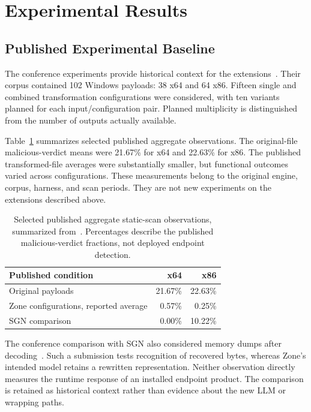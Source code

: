 \section{Experimental Results}\label{sec:results}
\subsection{Published Experimental Baseline}\label{sec:baseline}
The conference experiments provide historical context for the
extensions~\cite{zone_secrypt_2026}. Their corpus contained 102 Windows
payloads: 38 x64 and 64 x86. Fifteen single and combined transformation
configurations were considered, with ten variants planned for each
input/configuration pair. Planned multiplicity is distinguished from
the number of outputs actually available.

Table~\ref{tab:historical} summarizes selected published aggregate
observations. The original-file malicious-verdict means were 21.67\%
for x64 and 22.63\% for x86. The published transformed-file averages were
substantially smaller, but functional outcomes varied across
configurations. These measurements belong to the original engine,
corpus, harness, and scan periods. They are not new experiments on the
extensions described above.

\begin{table}[t]
\caption{Selected published aggregate static-scan observations,
summarized from~\cite{zone_secrypt_2026}. Percentages describe the
published malicious-verdict fractions, not deployed endpoint detection.}
\label{tab:historical}
\centering\small
\begin{tabular}{@{}lrr@{}}
\toprule
Published condition & x64 & x86 \\
\midrule
Original payloads & 21.67\% & 22.63\% \\
Zone configurations, reported average & 0.57\% & 0.25\% \\
SGN comparison & 0.00\% & 10.22\% \\
\bottomrule
\end{tabular}
\end{table}

The conference comparison with SGN also considered memory dumps after
decoding~\cite{zone_secrypt_2026}. Such a submission tests recognition
of recovered bytes, whereas Zone's intended model retains a rewritten
representation. Neither observation directly measures the runtime
response of an installed endpoint product. The comparison is retained
as historical context rather than evidence about the new LLM or
wrapping paths.

